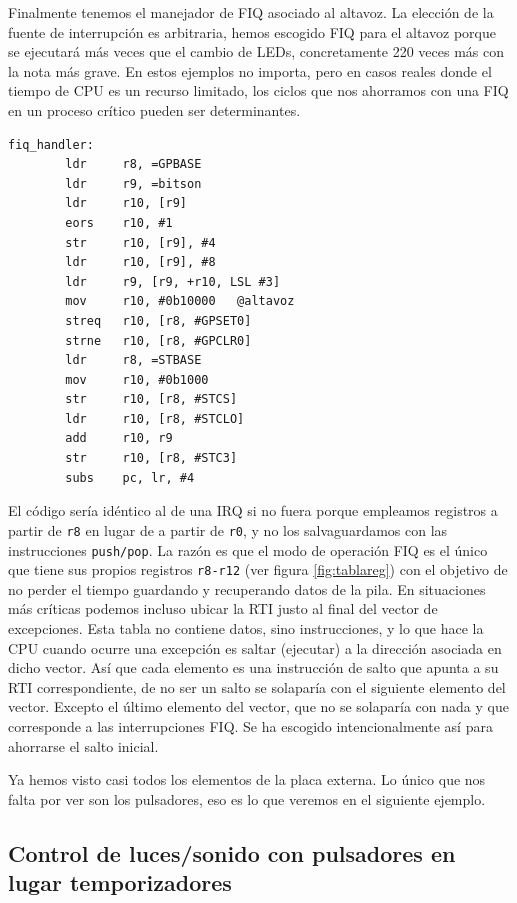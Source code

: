 Finalmente tenemos el manejador de FIQ asociado al altavoz. La elección de la fuente de
interrupción es arbitraria, hemos escogido FIQ para el altavoz porque se ejecutará más veces
que el cambio de LEDs, concretamente 220 veces más con la nota más grave. En estos ejemplos
no importa, pero en casos reales donde el tiempo de CPU es un recurso limitado, los ciclos
que nos ahorramos con una FIQ en un proceso crítico pueden ser determinantes.

\begin{lstlisting}
fiq_handler:
        ldr     r8, =GPBASE
        ldr     r9, =bitson
        ldr     r10, [r9]
        eors    r10, #1
        str     r10, [r9], #4
        ldr     r10, [r9], #8
        ldr     r9, [r9, +r10, LSL #3]
        mov     r10, #0b10000   @altavoz
        streq   r10, [r8, #GPSET0]
        strne   r10, [r8, #GPCLR0]
        ldr     r8, =STBASE
        mov     r10, #0b1000
        str     r10, [r8, #STCS]
        ldr     r10, [r8, #STCLO]
        add     r10, r9
        str     r10, [r8, #STC3]
        subs    pc, lr, #4
\end{lstlisting}

El código sería idéntico al de una IRQ si no fuera porque empleamos registros a partir de
{\tt r8} en lugar de a partir de {\tt r0}, y no los salvaguardamos con las instrucciones
{\tt push/pop}. La razón es que el modo de operación FIQ es el único que tiene sus propios
registros {\tt r8-r12} (ver figura \ref{fig:tablareg}) con el objetivo de no perder el tiempo
guardando y recuperando datos de la pila. En situaciones más críticas podemos incluso ubicar
la RTI justo al final del vector de excepciones. Esta tabla no contiene datos, sino instrucciones,
y lo que hace la CPU cuando ocurre una excepción es saltar (ejecutar) a la dirección asociada en
dicho vector. Así que cada elemento es una instrucción de salto que apunta a su RTI
correspondiente, de no ser un salto se solaparía con el siguiente elemento del vector. Excepto
el último elemento del vector, que no se solaparía con nada y que corresponde a las
interrupciones FIQ. Se ha escogido intencionalmente así para ahorrarse el salto inicial.

Ya hemos visto casi todos los elementos de la placa externa. Lo único que nos falta por ver
son los pulsadores, eso es lo que veremos en el siguiente ejemplo.

\subsection{Control de luces/sonido con pulsadores en lugar temporizadores}

